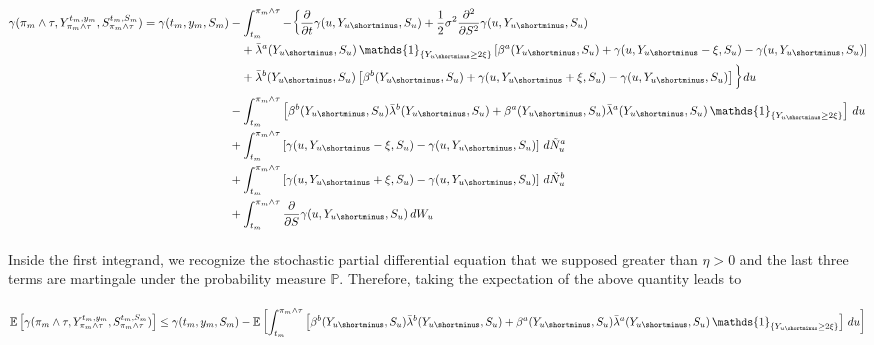 \documentclass[8pt]{article}
\begin{document}
$\begin{aligned}
\gamma(\pi_m \wedge \tau, Y^{t_m, y_m}_{\pi_m \wedge \tau}, S^{t_m, S_m}_{\pi_m \wedge \tau}) 
= \gamma(t_m, y_m, S_m) 
&- \int_{t_m}^{\pi_m \wedge \tau} - \bigg\{
    \frac{\partial}{\partial t} \gamma(u, Y_{u\shortminus}, S_u) 
    + \frac{1}{2} \sigma^2 \frac{\partial^2}{\partial S^2} \gamma(u, Y_{u\shortminus}, S_u) \\
&\quad + \bar{\lambda}^a(Y_{u\shortminus}, S_u) \, \mathds{1}_{\{Y_{u\shortminus} \ge 2\xi\}} 
    \left[\beta^a(Y_{u\shortminus},S_u) + \gamma(u, Y_{u\shortminus} - \xi, S_u) - \gamma(u, Y_{u\shortminus}, S_u)\right] \\
&\quad + \bar{\lambda}^b(Y_{u\shortminus}, S_u) 
    \left[\beta^b(Y_{u\shortminus},S_u) + \gamma(u, Y_{u\shortminus} + \xi, S_u) - \gamma(u, Y_{u\shortminus}, S_u)\right]
\bigg\} du \\
& - \int_{t_m}^{\pi_m \wedge \tau}  \left[\beta^b(Y_{u\shortminus},S_u) \bar{\lambda}^b(Y_{u\shortminus}, S_u) + \beta^a(Y_{u\shortminus},S_u) \bar{\lambda}^a(Y_{u\shortminus}, S_u) \, \mathds{1}_{\{Y_{u\shortminus} \ge 2\xi\}}\right] \, du \\
&+ \int_{t_m}^{\pi_m \wedge \tau} 
    \left[\gamma(u, Y_{u\shortminus} - \xi, S_u) - \gamma(u, Y_{u\shortminus}, S_u)\right] \, d\tilde{N}^a_u \\
&+ \int_{t_m}^{\pi_m \wedge \tau} 
    \left[\gamma(u, Y_{u\shortminus} + \xi, S_u) - \gamma(u, Y_{u\shortminus}, S_u)\right] \, d\tilde{N}^b_u \\
&+ \int_{t_m}^{\pi_m \wedge \tau} 
    \frac{\partial}{\partial S} \gamma(u, Y_{u\shortminus}, S_u) \, dW_u
\end{aligned}$
\\ \\
Inside the first integrand, we recognize the stochastic partial differential equation that we supposed greater than $\eta > 0$ and the last three terms are martingale under the probability measure $\mathbb{P}$. Therefore, taking the expectation of the above quantity leads to
\\ \\
$\begin{aligned}
\mathbb{E}\left[\gamma(\pi_m \wedge \tau, Y^{t_m, y_m}_{\pi_m \wedge \tau}, S^{t_m, S_m}_{\pi_m \wedge \tau})\right]
\leq \gamma(t_m, y_m, S_m)  - \mathbb{E} \left[\int_{t_m}^{\pi_m \wedge \tau}  \left[\beta^b(Y_{u\shortminus},S_u) \bar{\lambda}^b(Y_{u\shortminus}, S_u) + \beta^a(Y_{u\shortminus},S_u) \bar{\lambda}^a(Y_{u\shortminus}, S_u) \, \mathds{1}_{\{Y_{u\shortminus} \ge 2\xi\}}\right] \, du \right] \\
\end{aligned}$
\end{document}
